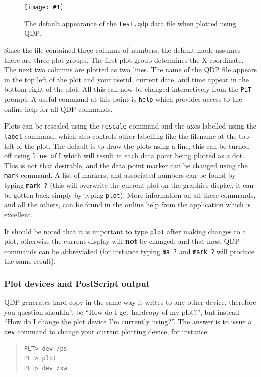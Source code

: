 \documentclass[twoside,11pt]{article}
\newcommand{\htmladdimg}[1]{}
\newcommand{\myfig} [5] {
  \begin{figure}
    \centering\texttt{[image: \#1]}
    \typeout{#1 inserted on page \arabic{page}}
    \caption{\label{#4}#5}
  \end{figure}
  }
\newcommand{\myfig}[5]{
    \label{#4} \htmladdimg{#3}\\
    Figure: #5\\
    }
\begin{document}
\myfig{sc15_qdp_plot_1.eps}{height=0.3\textheight}{sc15_qdp_plot_1.gif}{sc15_qdp_plot_1}{The default appearance of the {\tt test.qdp} data file when plotted using QDP.} 

Since the file contained three columns of numbers, the default mode assumes there are three plot groups. The first plot group determines the X
coordinate. The next two columns are plotted as two lines. The name of the QDP file appears in the top left of the plot and your userid, current date, and time appear in the bottom right of the plot. All this can now be changed interactively from the {\tt PLT} prompt. A useful command at this point is {\tt help} which provides access to the online help for all QDP commands.

Plots can be rescaled using the {\tt rescale} command and the axes labelled using the {\tt label} command, which also controls other labelling like the filename at the top left of the plot. The default is to draw the plots using a line, this can be turned off using {\tt line off} which will result in each data point being plotted as a dot. This is not that desirable, and the data point marker can be changed using the {\tt mark} command. A list of markers, and associated numbers can be found by typing {\tt mark ?} (this will overwrite the current plot on the graphics display, it can be gotten back simply by typing {\tt plot}). More information on all these commands, and all the others, can be found in the online help from the application which is excellent.

It should be noted that it is important to type {\tt plot} after making changes to a plot, otherwise the current display will {\bf not} be changed, and that most QDP commands can be abbreviated (for instance typing {\tt ma ?} and {\tt mark ?} will produce the same result).

\subsubsection{Plot devices and PostScript output}

QDP generates hard copy in the same way it writes to any other device, therefore you question shouldn't be ``How do I get hardcopy of my plot?'', but instead ``How do I change the plot device I'm currently using?''. The answer is to issue a {\tt dev} command to change your current plotting device, for instance:

\small
\begin{quote}
\begin{verbatim}
PLT> dev /ps
PLT> plot
PLT> dev /xw
\end{verbatim}
\end{quote}
\normalsize
\end{document}
